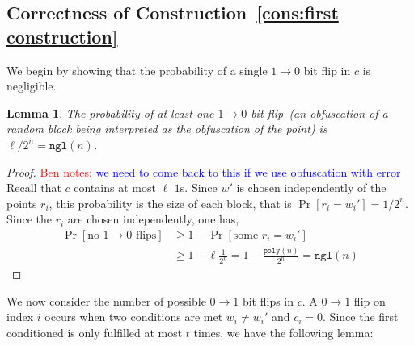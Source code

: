 \documentclass[11pt]{article}
\newcommand{\lemref}[1]{\mbox{Lemma~\ref{#1}}}
\newcommand{\consref}[1]{\mbox{Construction~\ref{#1}}}
\DeclareMathOperator*{\expe}{\mathbb{E}}
\newcommand{\dis}{\ensuremath{\mathsf{dis}}}
\newcommand{\poly}{\ensuremath{\mathtt{poly}}\xspace}
\newcommand{\ngl}{\ensuremath{\mathtt{ngl}}\xspace}
\newcommand{\Hav}{\tilde{\mathrm{H}}_\infty}
\newtheorem{lemma}[theorem]{Lemma}
\newcommand{\authnote}[2]{{\textcolor{red}{\textsf{#1 notes: }\textcolor{blue}{ #2}}\marginpar{\textcolor{red}{\textbf{!!!!!}}}}}
\newcommand{\authnote}[2]{}
\newcommand{\bnote}[1]{{\authnote{Ben}{#1}}}
\begin{document}

\subsection{Correctness of \consref{cons:first construction}}
We begin by showing that the probability of a single $1\rightarrow 0$ bit flip in $c$ is negligible.
\begin{lemma}
\label{lem:no 1 to 0 flips}
The probability of at least one $1\rightarrow 0$ bit flip~(an obfuscation of a random block being interpreted as the obfuscation of the point) is $ \ell/2^n = \ngl(n)$.
\end{lemma}
\begin{proof}
\bnote{we need to come back to this if we use obfuscation with error}
Recall that $c$ contains at most $\ell$ $1$s.  Since $w'$ is chosen independently of the points $r_i$, this probability is the size of each block, that is $\Pr[r_i =w_i']  = 1/2^n$. Since the $r_i$ are chosen independently, one has,
\begin{align*}
\Pr[\text{no $1\rightarrow 0$ flips}] &\geq 1-\Pr[\text{some }r_i = w_i']\\
&\geq 1-\ell \frac{1}{2^n} = 1-\frac{\poly(n)}{2^n} = \ngl(n)
\end{align*}
\end{proof}

We now consider the number of possible $0\rightarrow 1$ bit flips in $c$.  A $0\rightarrow 1$ flip on index $i$ occurs when two conditions are met $w_i\neq w_i'$ and $c_i = 0$.  Since the first conditioned is only fulfilled at most $t$ times, we have the following lemma:
\end{document}
